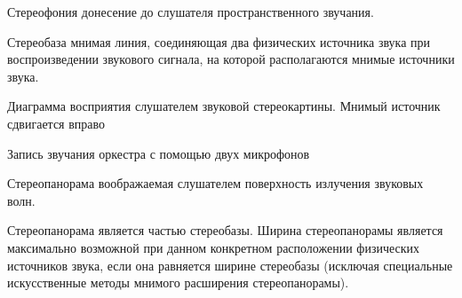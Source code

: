 \documentclass{beamer}
\begin{document}
\begin{frame}
  \begin{block}{Стереофония} 
    донесение до слушателя пространственного звучания.
  \end{block}
  \begin{block}{Стереобаза} 
    мнимая линия, соединяющая два физических источника звука при воспроизведении звукового сигнала, на которой располагаются мнимые источники звука.
  \end{block}
\end{frame} 

\begin{frame}
  \begin{block}{Диаграмма восприятия слушателем звуковой стереокартины. Мнимый источник сдвигается вправо} 
  \end{block}
\end{frame}

\begin{frame}
  \begin{block}{Запись звучания оркестра с помощью двух микрофонов} 
  \end{block}
  \begin{block}{Стереопанорама}
    воображаемая слушателем поверхность излучения звуковых волн.   
  \end{block}
Стереопанорама является частью стереобазы. Ширина стереопанорамы является максимально возможной при данном конкретном расположении физических источников звука, если она равняется ширине стереобазы (исключая специальные искусственные методы мнимого расширения стереопанорамы).
\end{frame}
\end{document}
